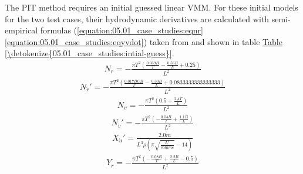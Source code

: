 \documentclass[review]{elsarticle}
\begin{document}
  
The PIT method requires an initial guessed linear VMM. For these initial models for the two test cases, their hydrodynamic derivatives are calculated with semi-empirical formulas (\autoref{equation:05.01_case_studies:eqnr}\sphinxhyphen{}\autoref{equation:05.01_case_studies:eqyvdot}) taken from \cite{brix_maneuvering_1993} and shown in table \hyperref[\detokenize{05.01_case_studies:intial-guess}]{Table \ref{\detokenize{05.01_case_studies:intial-guess}}}.
\begin{equation}\label{equation:05.01_case_studies:eqnr}
\begin{split}\displaystyle N_{r} = - \frac{\pi T^{2} \left(\frac{0.039 B}{T} - \frac{0.56 B}{L} + 0.25\right)}{L^{2}}\end{split}
\end{equation}\begin{equation}\label{equation:05.01_case_studies:eqnrdot}
\begin{split}\displaystyle N_{\dot{r}}' = - \frac{\pi T^{2} \left(\frac{0.017 B CB}{T} - \frac{0.33 B}{L} + 0.0833333333333333\right)}{L^{2}}\end{split}
\end{equation}\begin{equation}\label{equation:05.01_case_studies:eqnv}
\begin{split}\displaystyle N_{v} = - \frac{\pi T^{2} \left(0.5 + \frac{2.4 T}{L}\right)}{L^{2}}\end{split}
\end{equation}\begin{equation}\label{equation:05.01_case_studies:eqnvdot}
\begin{split}\displaystyle N_{\dot{v}}' = - \frac{\pi T^{2} \left(- \frac{0.04 B}{T} + \frac{1.1 B}{L}\right)}{L^{2}}\end{split}
\end{equation}\begin{equation}\label{equation:05.01_case_studies:eqxudot}
\begin{split}\displaystyle X_{\dot{u}}' = \frac{2.0 m}{L^{3} \rho \left(\pi \sqrt{\frac{L^{3}}{volume}} - 14\right)}\end{split}
\end{equation}\begin{equation}\label{equation:05.01_case_studies:eqyr}
\begin{split}\displaystyle Y_{r} = - \frac{\pi T^{2} \left(- \frac{0.08 B}{T} + \frac{2.2 B}{L} - 0.5\right)}{L^{2}}\end{split}
\end{equation}\begin{equation}\label{equation:05.01_case_studies:eqyrdot}

\end{equation}
\end{document}
